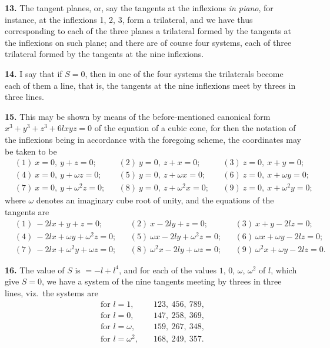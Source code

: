 \documentclass[11pt,a4paper]{article}
\theoremstyle{plain}
\begin{document}
\noindent\textbf{13.} The tangent planes, or, say the tangents at the inflexions \textit{in piano}, for instance, at the inflexions 1, 2, 3, form a trilateral, and we have thus corresponding to each of the three planes a trilateral formed by the tangents at the inflexions on such plane; and there are of course four systems, each of three trilateral formed by the tangents at the nine inflexions.

\noindent\textbf{14.} I say that if $S=0$, then in one of the four systems the trilaterals become each of them a line, that is, the tangents at the nine inflexions meet by threes in three lines.

\noindent\textbf{15.} This may be shown by means of the before-mentioned canonical form $x^3+y^3+z^3+6lxyz=0$ of the equation of a cubic cone, for then the notation of the inflexions being in accordance with the foregoing scheme, the coordinates may be taken to be
\begin{align*}
&(1)\ x=0, \ y+z=0; && (2)\ y=0, \ z+x=0; && (3)\ z=0, \ x+y=0;\\
&(4)\ x=0, \ y+\omega z=0; && (5)\ y=0, \ z+\omega x=0; && (6)\ z=0, \ x+\omega y=0;\\
&(7)\ x=0, \ y+\omega^2z=0; && (8)\ y=0, \ z+\omega^2x=0; && (9)\ z=0, \ x+\omega^2y=0;
\end{align*}
where $\omega$ denotes an imaginary cube root of unity, and the equations of the tangents are
\begin{align*}
&(1)\ -2lx+y+z=0; && (2)\ x-2ly+z=0; && (3)\ x+y-2lz=0;\\
&(4)\ -2lx+\omega y+\omega^2z=0; && (5)\ \omega x-2ly+\omega^2z=0; && (6)\ \omega x+\omega y-2lz=0;\\
&(7)\ -2lx+\omega^2y+\omega z=0; && (8)\ \omega^2x-2ly+\omega z=0; && (9)\ \omega^2x+\omega y-2lz=0.
\end{align*}

\noindent\textbf{16.} The value of $S$ is $=-l+l^4$, and for each of the values $1$, $0$, $\omega$, $\omega^2$ of $l$, which give $S=0$, we have a system of the nine tangents meeting by threes in three lines, viz.\ the systems are
\begin{align*}
\text{for } l=1, &\quad 123, \ 456, \ 789,\\
\text{for } l=0, &\quad 147, \ 258, \ 369,\\
\text{for } l=\omega, &\quad 159, \ 267, \ 348,\\
\text{for } l=\omega^2, &\quad 168, \ 249, \ 357.
\end{align*}
\end{document}
